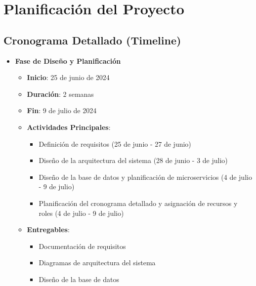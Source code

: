 \section{Planificación del Proyecto}

\subsection{Cronograma Detallado (Timeline)}

\begin{itemize}
    \item \textbf{Fase de Diseño y Planificación}
          \begin{itemize}
              \item \textbf{Inicio}: 25 de junio de 2024
              \item \textbf{Duración}: 2 semanas
              \item \textbf{Fin}: 9 de julio de 2024
              \item \textbf{Actividades Principales}:
                    \begin{itemize}
                        \item Definición de requisitos (25 de junio - 27 de junio)
                        \item Diseño de la arquitectura del sistema (28 de junio - 3 de julio)
                        \item Diseño de la base de datos y planificación de microservicios (4 de julio - 9 de julio)
                        \item Planificación del cronograma detallado y asignación de recursos y roles (4 de julio - 9 de julio)
                    \end{itemize}
              \item \textbf{Entregables}:
                    \begin{itemize}
                        \item Documentación de requisitos
                        \item Diagramas de arquitectura del sistema
                        \item Diseño de la base de datos
                    \end{itemize}
          \end{itemize}


\end{itemize}
